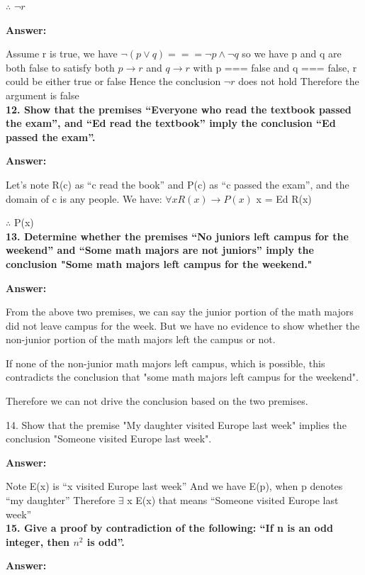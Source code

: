 \documentclass{article}
\begin{document}
\begin{large}
$\therefore$ $\lnot r$


\textbf{Answer:}


Assume r is true, 
we have $\lnot (p \lor q) === \lnot p \land \lnot q$ so we have p and q are both false
to satisfy both {$p \to r$} and {$q \to r$} with p === false and q === false,
r could be either true or false
Hence the conclusion $\lnot r$ does not hold
Therefore the argument is false\\

\textbf{12. Show that the premises ``Everyone who read the textbook passed the exam'', and ``Ed read the textbook'' imply the conclusion ``Ed passed the exam''.}

\textbf{Answer:}

Let's note R(c) as ``c read the book'' and P(c) as ``c passed the exam'', and the domain of c is any people.
We have:
$\forall x R(x) \to P(x)$
x = Ed
R(x)

$\therefore$ P(x)\\

\textbf{13. Determine whether the premises ``No juniors left campus for the weekend'' and ``Some math majors are not juniors'' imply the conclusion "Some math majors left campus for the weekend."}

\textbf{Answer:}

From the above two premises, we can say the junior portion of the math majors did not leave campus for the week. But we have no evidence to show whether the non-junior portion of the math majors left the campus or not.

If none of the non-junior math majors left campus, which is possible, this contradicts the conclusion that "some math majors left campus for the weekend". 

Therefore we can not drive the conclusion based on the two premises.

14. Show that the premise "My daughter visited Europe last week" implies the conclusion "Someone visited Europe last week".

\textbf{Answer:}

Note E(x) is ``x visited Europe last week''
And we have E(p), when p denotes ``my daughter''
Therefore $\exists$ x E(x) that means ``Someone visited Europe last week''\\

\textbf{15. Give a proof by contradiction of the following: ``If n is an odd integer, then $n^2$ is odd''.}

\textbf{Answer:}


\end{large}
\end{document}
